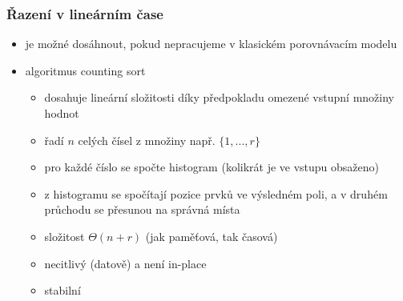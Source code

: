 \subsubsection*{Řazení v lineárním čase}
\begin{itemize}
	\item je možné dosáhnout, pokud nepracujeme v klasickém porovnávacím modelu
	\item algoritmus counting sort
	\begin{itemize}
		\item dosahuje lineární složitosti díky předpokladu omezené vstupní množiny hodnot
		\item řadí $n$ celých čísel z množiny např. $\{1,...,r\}$ 
		\item pro každé číslo se spočte histogram (kolikrát je ve vstupu obsaženo)
		\item z histogramu se spočítají pozice prvků ve výsledném poli, a v druhém průchodu se přesunou na správná místa
		\item složitost $\Theta (n + r)$ (jak paměťová, tak časová)
		\item necitlivý (datově) a není in-place
		\item stabilní
	\end{itemize}
\end{itemize}
